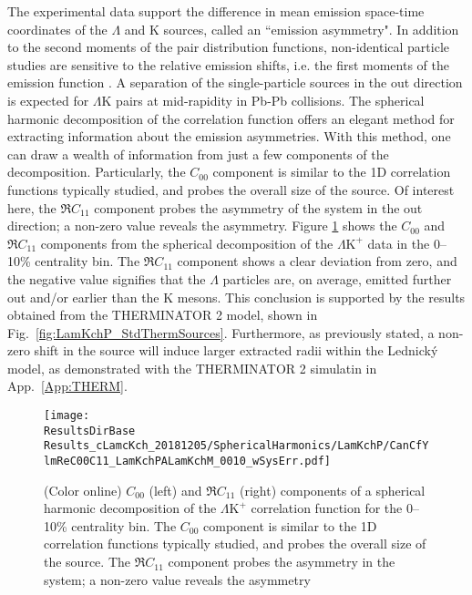 \documentclass[ALICE,manyauthors]{cernphprep}
\newcommand{\ResultsDirBase}{/home/jesse/Analysis/FemtoAnalysis/Results/}
\newcommand{\Lam}{$\Lambda$\xspace}
\newcommand{\LamK}{$\Lambda$K\xspace}
\newcommand{\LamKchP}{$\Lambda\mathrm{K^{+}}$\xspace}
\begin{document}
The experimental data support the difference in mean emission space-time coordinates of the \Lam and K sources, called an ``emission asymmetry".
In addition to the second moments of the pair distribution functions, non-identical particle studies are sensitive to the relative emission shifts, i.e. the first moments of the emission function \cite{Kisiel:2009eh}.
A separation of the single-particle sources in the out direction is expected for \LamK pairs at mid-rapidity in Pb-Pb collisions.
The spherical harmonic decomposition of the correlation function offers an elegant method for extracting information about the emission asymmetries.
With this method, one can draw a wealth of information from just a few components of the decomposition.
Particularly, the $C_{00}$ component is similar to the 1D correlation functions typically studied, and probes the overall size of the source.
Of interest here, the $\Re C_{11}$ component probes the asymmetry of the system in the out direction; a non-zero value reveals the asymmetry. 
Figure \ref{fig:LamKchP_ReC00C11_0010} shows the $C_{00}$ and $\Re C_{11}$ components from the spherical decomposition of the \LamKchP data in the 0--10\% centrality bin.
The $\Re C_{11}$ component shows a clear deviation from zero, and the negative value signifies that the \Lam particles are, on average, emitted further out and/or earlier than the K mesons.
This conclusion is supported by the results obtained from the THERMINATOR 2 model, shown in Fig.\ \ref{fig:LamKchP_StdThermSources}.
Furthermore, as previously stated, a non-zero shift in the source will induce larger extracted radii within the Lednick\'y model, as demonstrated with the THERMINATOR 2 simulatin in App.\ \ref{App:THERM}.

\begin{figure}[h!]
  \centering
  \texttt{[image: \\ResultsDirBase Results\_cLamcKch\_20181205/SphericalHarmonics/LamKchP/CanCfYlmReC00C11\_LamKchPALamKchM\_0010\_wSysErr.pdf]}
  \caption[\LamKchP $C_{00}$ and $\Re C_{11}$ Spherical Harmonic Components (0--10\%)]
  {
  (Color online) $C_{00}$ (left) and $\Re C_{11}$ (right) components of a spherical harmonic decomposition of the \LamKchP correlation function for the 0--10\% centrality bin.  
The $C_{00}$ component is similar to the 1D correlation functions typically studied, and probes the overall size of the source.
The $\Re C_{11}$ component probes the asymmetry in the system; a non-zero value reveals the asymmetry
  }
  \label{fig:LamKchP_ReC00C11_0010}
\end{figure}
\end{document}
